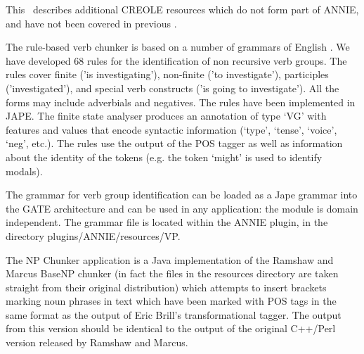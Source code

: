 %
%
%
%


\nnormalsize
This \chapthing\ describes additional CREOLE resources which do not form part of
ANNIE, and have not been covered in previous \chapthings.

The rule-based verb chunker is based on a number of grammars of English
\cite{collins:cobuild:99,azar:89}. We have developed 68 rules for the
identification of non recursive verb groups.  The rules cover finite
('is investigating'), non-finite ('to investigate'), participles
('investigated'), and special verb constructs ('is going to
investigate'). All the forms may include adverbials and negatives. The
rules have been implemented in JAPE. The finite state analyser
produces an annotation of type `VG' with features and values that
encode syntactic information (`type', `tense', `voice', `neg',
etc.). The rules use the output
of the POS tagger as well as information about the identity of the
tokens (e.g. the token `might' is used to identify modals).

The grammar for verb group identification can be loaded as a Jape
grammar into the GATE architecture and can be used in any application:
the module is domain independent. The grammar file is located within 
the ANNIE plugin, in the directory plugins/ANNIE/resources/VP. 


The NP Chunker application is a Java implementation of the Ramshaw and Marcus
BaseNP chunker (in fact the files in the resources directory are taken straight
from their original distribution) which attempts to insert brackets marking noun
phrases in text which have been marked with POS tags in the same format as the
output of Eric Brill's transformational tagger. The output from this version
should be identical to the output of the original C++/Perl version released by
Ramshaw and Marcus.

